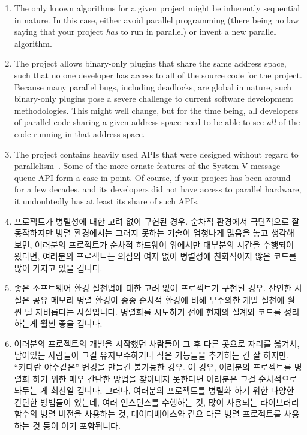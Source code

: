 {\begin{enumerate}
	\item	The only known algorithms for a given project might
		be inherently sequential in nature.
		In this case, either avoid parallel programming
		(there being no law saying that your project \emph{has}
		to run in parallel) or invent a new parallel algorithm.
	\item	The project allows binary-only plugins that share the same
		address space, such that no one developer has access to
		all of the source code for the project.
		Because many parallel bugs, including deadlocks, are
		global in nature, such binary-only plugins pose a severe
		challenge to current software development methodologies.
		This might well change, but for the time being, all
		developers of parallel code sharing a given address space
		need to be able to see \emph{all} of the code running in
		that address space.
	\item	The project contains heavily used APIs that were designed
		without regard to
		parallelism~\cite{HagitAttiya2011LawsOfOrder,Clements:2013:SCR:2517349.2522712}.
		Some of the more ornate features of the System V
		message-queue API form a case in point.
		Of course, if your project has been around for a few
		decades, and its developers did not have access to
		parallel hardware, it undoubtedly has at least
		its share of such APIs.

	\fi
	\item	프로젝트가 병렬성에 대한 고려 없이 구현된 경우.
		순차적 환경에서 극단적으로 잘 동작하지만 병렬 환경에서는 그러지
		못하는 기술이 엄청나게 많음을 놓고 생각해 보면, 여러분의
		프로젝트가 순차적 하드웨어 위에서만 대부분의 시간을 수행되어
		왔다면, 여러분의 프로젝트는 의심의 여지 없이 병렬성에
		친화적이지 않은 코드를 많이 가지고 있을 겁니다.
	\item	좋은 소프트웨어 환경 실천법에 대한 고려 없이 프로젝트가 구현된
		경우.
		잔인한 사실은 공유 메모리 병렬 환경이 종종 순차적 환경에 비해
		부주의한 개발 실천에 훨씬 덜 자비롭다는 사실입니다.
		병렬화를 시도하기 전에 현재의 설계와 코드를 정리하는게 훨씬
		좋을 겁니다.
	\item	여러분의 프로젝트의 개발을 시작했던 사람들이 그 후 다른 곳으로
		자리를 옮겨서, 남아있는 사람들이 그걸 유지보수하거나 작은
		기능들을 추가하는 건 잘 하지만, ``커다란 야수같은'' 변경을
		만들긴 불가능한 경우.
		이 경우, 여러분의 프로젝트를 병렬화 하기 위한 매우 간단한
		방법을 찾아내지 못한다면 여러분은 그걸 순차적으로 놔두는 게
		최선일 겁니다.
		그러나, 여러분의 프로젝트를 병렬화 하기 위한 다양한 간단한
		방법들이 있는데, 여러 인스턴스를 수행하는 것, 많이 사용되는
		라이브러리 함수의 병렬 버전을 사용하는 것, 데이터베이스와 같으
		다른 병렬 프로젝트를 사용하는 것 등이 여기 포함됩니다.


\end{enumerate}}
